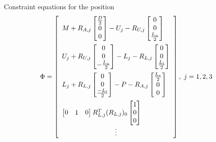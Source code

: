 Constraint equations for the position
\begin{equation}
    \Phi=
    \begin{bmatrix}
    \begin{array}{l} %
    M+R_{A,j}\begin{bmatrix}\frac{D}{2} \\ 0 \\0 \end{bmatrix} - U_j - R_{U,j} \begin{bmatrix}0\\ 0 \\\frac{L_u}{2}  \end{bmatrix}  \vspace{0.5em}\\
    U_j+R_{U,j}\begin{bmatrix}0 \\ 0 \\-\frac{L_u}{2} \end{bmatrix} - L_j - R_{L,j} \begin{bmatrix}0\\ 0 \\\frac{L_l}{2}  \end{bmatrix}  \vspace{0.5em}\\
    L_j+R_{L,j}\begin{bmatrix}0 \\ 0 \\ \frac{-L_l}{2} \end{bmatrix} - P - R_{A,j} \begin{bmatrix}\frac{L_e}{2}\\ 0 \\0 \end{bmatrix}  \vspace{0.5em} \\
    \begin{bmatrix} 0 & 1 & 0 \end{bmatrix}R_{L,j}^T(R_{L,j})_0\begin{bmatrix} 1\\ 0 \\0\end{bmatrix}
    \end{array}\\
    \vdots
    \end{bmatrix},\; j=1,2,3
\end{equation}

